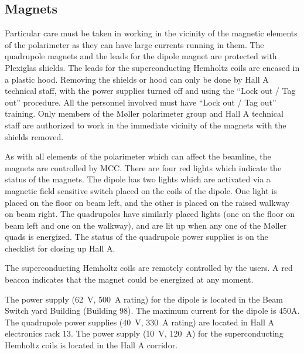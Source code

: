 \begin{safetyen}{0}{0}
\subsection{Magnets}

Particular care must be taken in working in the vicinity of the
magnetic elements of the polarimeter as they can have large currents
running in them. The quadrupole magnets and the leads for the dipole magnet 
are protected with Plexiglas shields. The leads for the superconducting Hemholtz
coils are encased in a plastic hood. Removing the shields or hood
can only be done by Hall A technical staff, with the power supplies
turned off and using the ``Lock out / Tag out'' procedure. All the personnel involved
must have ``Lock out / Tag out'' training.
Only members of the M{\o}ller polarimeter group and Hall A technical staff are
authorized to work in the immediate vicinity of the magnets with the shields
removed.

As with all elements of the
polarimeter which can
affect the beamline, the magnets are controlled by MCC. There are four
red lights which indicate the status of the magnets. The dipole has two
lights which are activated via a magnetic field sensitive switch placed
on the coils of the dipole. One light is placed on the floor on beam left,
and the other is placed on the raised walkway on beam right. The quadrupoles
have similarly placed lights (one on the floor on beam left and one
on the walkway), and are lit up when any one of the M{\o}ller quads is 
energized. The status of the quadrupole power supplies is on the 
checklist for
closing up Hall A.

The superconducting Hemholtz coils are remotely controlled by the users.
A red beacon indicates that the magnet could be energized at any moment.

The power supply (62~V, 500~A rating) for
the dipole is located in the Beam Switch yard Building (Building 98). 
The maximum current for the dipole is 450A. The
quadrupole power supplies (40~V, 330~A rating) are located in Hall A electronics rack 13.
The power supply (10~V, 120~A) for the superconducting Hemholtz coils is located in the Hall A corridor.


\end{safetyen}
